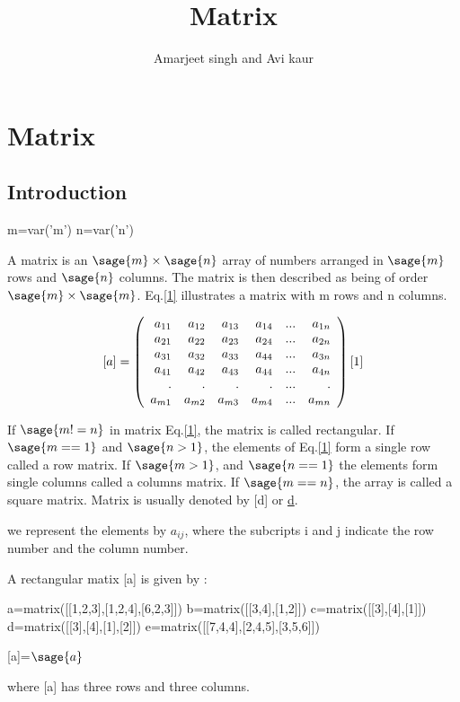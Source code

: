 \documentclass[12pt]{report}
\title{\textbf{Matrix}}
\author{Amarjeet singh and Avi kaur}
\begin{document}
\begin{titlepage}
\maketitle
\end{titlepage}
\chapter{Matrix}
\section{Introduction}
\begin{sagesilent}
m=var('m')
n=var('n')
\end{sagesilent}

A matrix is an $\sage{m} \times \sage{n}$  array of numbers arranged in $\sage{m}$ rows and $\sage{n}$ columns. The matrix is then described as being of order $\sage{m} \times \sage{m}$. Eq.\ref{1} illustrates a matrix with m rows and n columns.



\[[a]=\left(\begin{array}{rrrrrr}
a_{11} & a_{12} & a_{13} & a_{14} & ... & a_{1n} \\
a_{21} & a_{22} & a_{23} & a_{24} & ... & a_{2n} \\
a_{31} & a_{32} & a_{33} & a_{44} & ... & a_{3n} \\
a_{41} & a_{42} & a_{43} & a_{44} & ... & a_{4n} \\
.     & .     & .     & .     & ... & .     \\
a_{m1} & a_{m2} & a_{m3} & a_{m4} & ... & a_{mn} \\
\end{array}\right) \label{1} 
\ref{1} \] 

If $\sage{m!=n}$ in matrix Eq.\ref{1}, the matrix is called rectangular. If $\sage{m==1}$ and $\sage{n>1}$, the elements of Eq.\ref{1} form a single row called a row matrix. If $\sage{m>1}$, and $\sage{n==1}$ the elements form single columns called a columns matrix. If $\sage{m==n}$, the array is called a square matrix.
Matrix is usually denoted by [d] or \underline{d}.

we represent the elements by $a_{{ij}}$, where the subcripts i and j indicate the row number and the column number.

A rectangular matix [a] is given by : 
\begin{sagesilent}
a=matrix([[1,2,3],[1,2,4],[6,2,3]])
b=matrix([[3,4],[1,2]])
c=matrix([[3],[4],[1]])
d=matrix([[3],[4],[1],[2]])
e=matrix([[7,4,4],[2,4,5],[3,5,6]])
\end{sagesilent}
\begin{center}
[a]=$\sage{a}$
\end{center}
where [a] has three rows and three columns.
\end{document}
